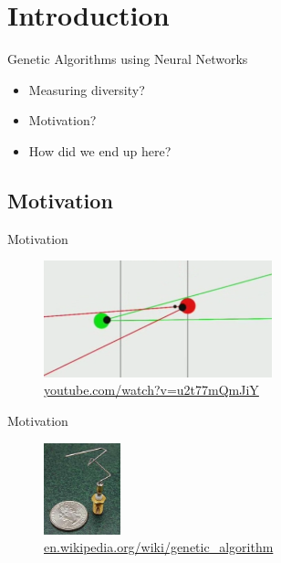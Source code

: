 
\section{Introduction}

\begin{frame}{Genetic Algorithms using Neural Networks}

  \begin{itemize}
    \item Measuring diversity?
    \item Motivation?
    \item How did we end up here?
  \end{itemize}
\end{frame}

\subsection{Motivation}

\begin{frame}{Motivation}
  \begin{figure}
    \centering
    \includegraphics[width=250px]{elias/images/sniper.png}
    \caption{\url{youtube.com/watch?v=u2t77mQmJiY}}
  \end{figure}
\end{frame}


\begin{frame}{Motivation}
  \begin{figure}
    \centering
    \includegraphics[height=100px]{elias/images/antenna.jpg}
    \caption{\url{en.wikipedia.org/wiki/genetic_algorithm}}
  \end{figure}
\end{frame}

